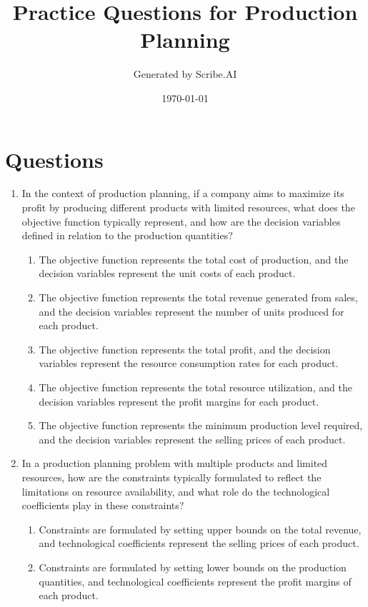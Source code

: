 \documentclass{article}%
\title{Practice Questions for Production Planning}%
\author{Generated by Scribe.AI}%
\date{\today}%
\begin{document}
%
\normalsize%
\maketitle%
\section{Questions}%
\label{sec:Questions}%
\begin{enumerate}%
\item In the context of production planning, if a company aims to maximize its profit by producing different products with limited resources, what does the objective function typically represent, and how are the decision variables defined in relation to the production quantities?%
\begin{enumerate}%
\item The objective function represents the total cost of production, and the decision variables represent the unit costs of each product.%
\item The objective function represents the total revenue generated from sales, and the decision variables represent the number of units produced for each product.%
\item The objective function represents the total profit, and the decision variables represent the resource consumption rates for each product.%
\item The objective function represents the total resource utilization, and the decision variables represent the profit margins for each product.%
\item The objective function represents the minimum production level required, and the decision variables represent the selling prices of each product.%
\end{enumerate}%
\vspace{1em}%
\item In a production planning problem with multiple products and limited resources, how are the constraints typically formulated to reflect the limitations on resource availability, and what role do the technological coefficients play in these constraints?%
\begin{enumerate}%
\item Constraints are formulated by setting upper bounds on the total revenue, and technological coefficients represent the selling prices of each product.%
\item Constraints are formulated by setting lower bounds on the production quantities, and technological coefficients represent the profit margins of each product.%

\end{enumerate}
\end{enumerate}
\end{document}
